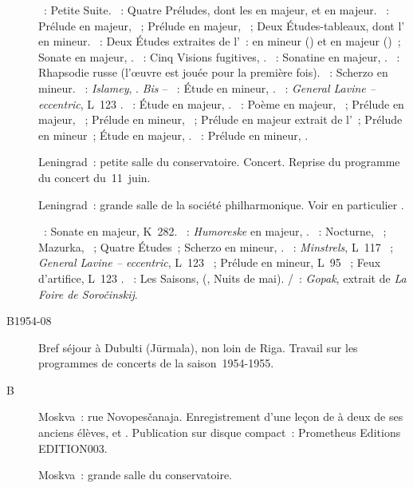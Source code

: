 \begin{description}
 \textsc{\Borodine{}}~: Petite Suite.
 \textsc{\Liadov{}}~: Quatre Préludes, dont les   en \kB
 \Flat majeur,   et   en \kG majeur.
 \textsc{\Rachmaninov{}}~: Prélude en \kD majeur,  ~;
 Prélude en \kG majeur,  ~; Deux Études-tableaux, dont
 l'  en \kB mineur.
 \textsc{\Scriabine{}}~: Deux Études extraites de l'~: en \kF
 \Sharp mineur () et en \kF \Sharp majeur ()~; Sonate en
 \kF \Sharp majeur, .
 \textsc{\Prokofiev{}}~: Cinq Visions fugitives,  .
 \textsc{\Kabalevski{}}~: Sonatine en \kC majeur,  .
 \textsc{\Krioukov{}}~: Rhapsodie russe (l'œuvre est jouée pour la première
 fois).
 \textsc{\Goltz{}}~: Scherzo en \kE mineur.
 \textsc{\Balakirev{}}~: \emph{Islamey}, .
 \emph{Bis} -- \textsc{\Mendelssohn{}}~: Étude en \kA mineur, 
 .
 \textsc{\Debussy{}}~: \emph{General Lavine -- eccentric}, L~123
 .
 \textsc{\Chopin{}}~: Étude en \kG \Flat majeur,  .
 \textsc{\Scriabine{}}~: Poème en \kF \Sharp majeur,  ~;
 Prélude en \kG \Flat majeur,  ~; Prélude en \kE \Flat
 mineur,  ~; Prélude en \kC majeur extrait de
 l'~; Prélude en \kA mineur~; Étude en \kD \Flat majeur, 
 .
 \textsc{\Rachmaninov{}}~: Prélude en \kG \Sharp mineur, 
 .
 \item[\DateWithWeekDay{1954-06-19}]
 Leningrad~: petite salle du conservatoire.
 Concert.
 Reprise du programme du concert du~11~juin.
 \item[\DateWithWeekDay{1954-06-21}]
 Leningrad~: grande salle de la société philharmonique.
 Voir en particulier \citet[p.~444]{Milshteyn82a}.

 \textsc{\Mozart{}}~: Sonate en \kE \Flat majeur, K~282.
 \textsc{\Schumann{}}~: \emph{Humoreske} en \kB \Flat majeur, .
 \textsc{\Chopin{}}~: Nocturne, ~; Mazurka, ~; Quatre
 Études~; Scherzo en \kB mineur, .
 \textsc{\Debussy{}}~: \emph{Minstrels}, L~117 ~; \emph{General
 Lavine -- eccentric}, L~123 ~; Prélude en \kA mineur, L~95
 ~; Feux d'artifice, L~123 .
 \textsc{\Tchaikovski{}}~: Les Saisons,  (, Nuits de
 mai).
 \textsc{\Moussorgski{}/\Rachmaninov{}}~: \emph{Gopak}, extrait de \emph{La
 Foire de Soročinskij}.
 \item[B1954-08]
 Bref séjour à Dubulti (Jūrmala), non loin de Riga.
 Travail sur les programmes de concerts de la saison~1954-1955.
 \item[B\DateWithWeekDay{1954-10-02}]
 Moskva~: rue Novopesčanaja.
 Enregistrement d'une leçon de \VSofronitsky{} à deux de ses anciens élèves,
 \PLobanov{} et \NFeigina{} \citep[voir][p.~350]{Lobanov08b}.
 Publication sur disque compact~: Prometheus Editions EDITION003.
 \item[\DateWithWeekDay{1954-10-10}]
 Moskva~: grande salle du conservatoire.


\end{description}
